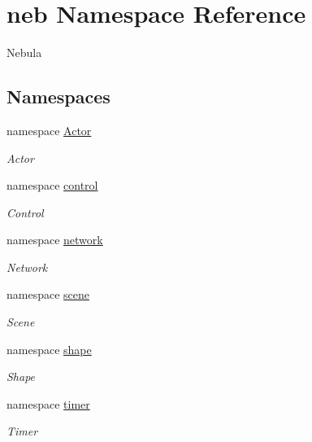 \hypertarget{namespaceneb}{
\section{neb Namespace Reference}
\label{namespaceneb}
}


Nebula  
\subsection*{Namespaces}
\begin{DoxyCompactItemize}
\item 
namespace \hyperlink{namespaceneb_1_1Actor}{Actor}


\begin{DoxyCompactList}\small\item\em Actor \item\end{DoxyCompactList}\item 
namespace \hyperlink{namespaceneb_1_1control}{control}


\begin{DoxyCompactList}\small\item\em Control \item\end{DoxyCompactList}\item 
namespace \hyperlink{namespaceneb_1_1network}{network}


\begin{DoxyCompactList}\small\item\em Network \item\end{DoxyCompactList}\item 
namespace \hyperlink{namespaceneb_1_1scene}{scene}


\begin{DoxyCompactList}\small\item\em Scene \item\end{DoxyCompactList}\item 
namespace \hyperlink{namespaceneb_1_1shape}{shape}


\begin{DoxyCompactList}\small\item\em Shape \item\end{DoxyCompactList}\item 
namespace \hyperlink{namespaceneb_1_1timer}{timer}


\begin{DoxyCompactList}\small\item\em Timer \item\end{DoxyCompactList}\end{DoxyCompactItemize}
